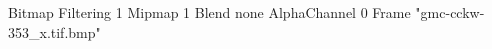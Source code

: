 {Bitmap
	{Filtering 1}
	{Mipmap 1}
	{Blend none}
	{AlphaChannel 0}
	{Frame "gmc-cckw-353_x.tif.bmp"}
}
